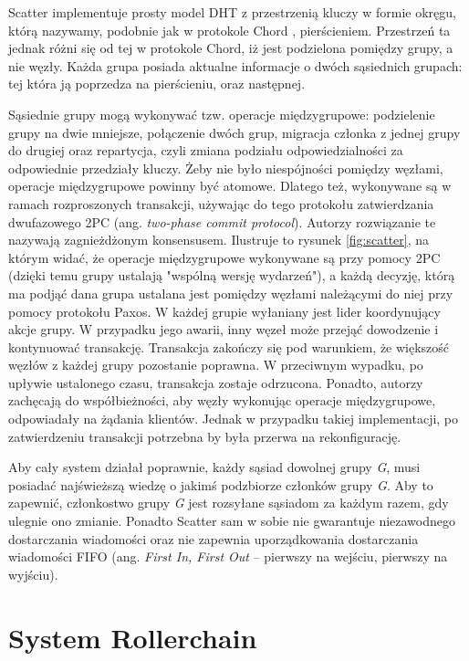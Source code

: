 \documentclass[12pt, twoside, openany]{report}
\begin{document}
Scatter implementuje prosty model DHT z przestrzenią kluczy w formie okręgu, którą nazywamy, podobnie jak w protokole Chord , pierścieniem. Przestrzeń ta jednak różni się od tej w protokole Chord, iż jest podzielona pomiędzy grupy, a nie węzły. Każda grupa posiada aktualne informacje o dwóch sąsiednich grupach: tej która ją poprzedza na pierścieniu, oraz następnej.

Sąsiednie grupy mogą wykonywać tzw. operacje międzygrupowe: podzielenie grupy na dwie mniejsze, połączenie dwóch grup, migracja członka z jednej grupy do drugiej oraz repartycja, czyli zmiana podziału odpowiedzialności za odpowiednie przedziały kluczy. Żeby nie było niespójności pomiędzy węzłami, operacje międzygrupowe powinny być atomowe. Dlatego też, wykonywane są w ramach rozproszonych transakcji, używając do tego protokołu zatwierdzania dwufazowego 2PC (ang. \textit{two-phase commit protocol}). Autorzy rozwiązanie te nazywają zagnieżdżonym konsensusem. Ilustruje to rysunek \ref{fig:scatter}, na którym widać, że operacje międzygrupowe wykonywane są przy pomocy 2PC (dzięki temu grupy ustalają "wspólną wersję wydarzeń"), a każdą decyzję, którą ma podjąć dana grupa ustalana jest pomiędzy węzłami należącymi do niej przy pomocy protokołu Paxos. W każdej grupie wyłaniany jest lider koordynujący akcje grupy. W przypadku jego awarii, inny węzeł może przejąć dowodzenie i kontynuować transakcję. Transakcja zakończy się pod warunkiem, że większość węzłów z każdej grupy pozostanie poprawna. W przeciwnym wypadku, po upływie ustalonego czasu, transakcja zostaje odrzucona. Ponadto, autorzy zachęcają do współbieżności, aby węzły wykonując operacje międzygrupowe, odpowiadały na żądania klientów. Jednak w przypadku takiej implementacji, po zatwierdzeniu transakcji potrzebna by była przerwa na rekonfigurację.

Aby cały system działał poprawnie, każdy sąsiad dowolnej grupy \textit{G}, musi posiadać najświeższą wiedzę o jakimś podzbiorze członków grupy \textit{G}. Aby to zapewnić, członkostwo grupy \textit{G} jest rozsyłane sąsiadom za każdym razem, gdy ulegnie ono zmianie. Ponadto Scatter sam w sobie nie gwarantuje niezawodnego dostarczania wiadomości oraz nie zapewnia uporządkowania dostarczania wiadomości FIFO (ang. \textit{First In, First Out} – pierwszy na wejściu, pierwszy na wyjściu).

\section{System Rollerchain}
\label{subch_rollerchain}
\end{document}

